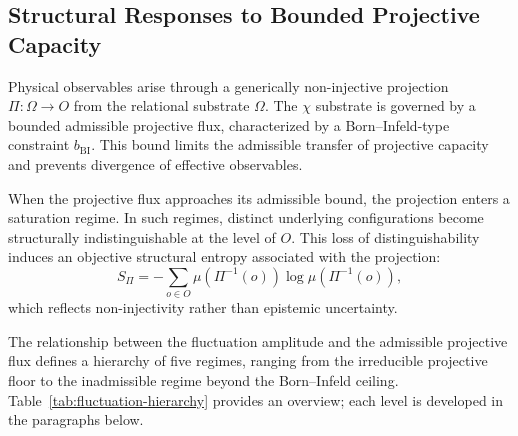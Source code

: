 \subsection{Structural Responses to Bounded Projective Capacity}
  \label{subsec:structural-interpretation-projective-thermodynamics}

  Physical observables arise through a generically non-injective projection
  $\Pi : \Omega \rightarrow O$ from the relational substrate $\Omega$.
  The $\chi$ substrate is governed by a bounded admissible projective flux,
  characterized by a Born--Infeld-type constraint $b_{\mathrm{BI}}$.
  This bound limits the admissible transfer of projective capacity
  and prevents divergence of effective observables.

  When the projective flux approaches its admissible bound,
  the projection enters a saturation regime.
  In such regimes, distinct underlying configurations
  become structurally indistinguishable at the level of $O$.
  This loss of distinguishability induces an objective structural entropy
  associated with the projection:
  \begin{equation}
    S_{\Pi} = -\sum_{o \in O}
    \mu(\Pi^{-1}(o)) \log \mu(\Pi^{-1}(o)),
  \end{equation}
  which reflects non-injectivity rather than epistemic uncertainty.

  The relationship between the fluctuation amplitude and the admissible projective flux
  defines a hierarchy of five regimes, ranging from the irreducible projective floor
  to the inadmissible regime beyond the Born--Infeld ceiling.
  Table~\ref{tab:fluctuation-hierarchy} provides an overview; each level is developed
  in the paragraphs below.

